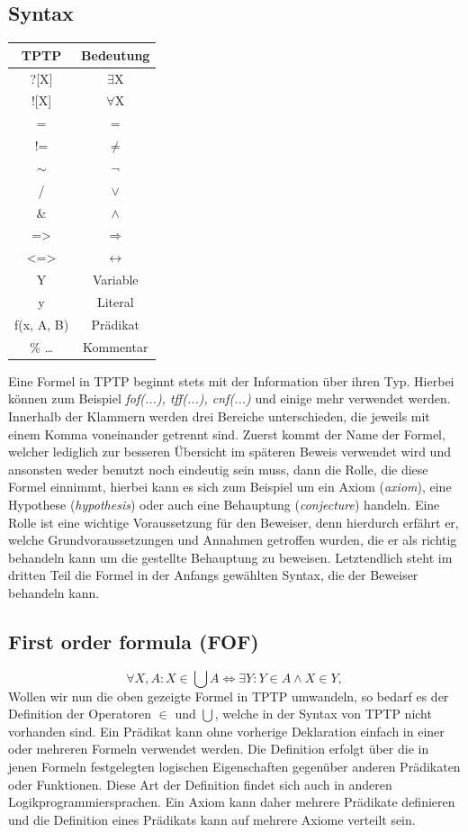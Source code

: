 \documentclass{article}
\begin{document}
\subsection{Syntax}
\label{subsec:syntax}
\begin{table}
\begin{tabular}{|c|c|}
	\hline TPTP & Bedeutung \\ 
	\hline ?[X] & $\exists$X \\
	\hline ![X] & $\forall$X \\
	\hline = & = \\
	\hline != & $\neq$ \\
	\hline $\sim$ & $\lnot$ \\
	\hline / & $\lor$ \\
	\hline \& & $\land$ \\
	\hline => & $\Rightarrow$ \\
	\hline <=> & $\leftrightarrow$ \\
	\hline Y & Variable \\
	\hline y & Literal \\
	\hline f(x, A, B) & Prädikat \\
	\hline \% \dots & Kommentar \\
	\hline
\end{tabular} 
\end{table}
Eine Formel in TPTP beginnt stets mit der Information über ihren Typ. Hierbei können zum Beispiel \textit{fof(...), tff(...), cnf(...)} und einige mehr verwendet werden.
Innerhalb der Klammern werden drei Bereiche unterschieden, die jeweils mit einem Komma voneinander getrennt sind. 
Zuerst kommt der Name der Formel, welcher lediglich zur besseren Übersicht im späteren Beweis verwendet wird und ansonsten weder benutzt noch eindeutig sein muss,
dann die Rolle, die diese Formel einnimmt, hierbei kann es sich zum Beispiel um ein Axiom (\textit{axiom}), eine Hypothese (\textit{hypothesis}) oder auch eine Behauptung (\textit{conjecture}) handeln.
Eine Rolle ist eine wichtige Voraussetzung für den Beweiser, denn hierdurch erfährt er, welche Grundvoraussetzungen und Annahmen getroffen wurden, die er als richtig behandeln kann um die gestellte Behauptung zu beweisen.
Letztendlich steht im dritten Teil die Formel in der Anfangs gewählten Syntax, die der Beweiser behandeln kann.
\subsection{First order formula (FOF)}
\label{subsec:tptpfof}
\[\forall X,A : X \in \bigcup A \Leftrightarrow \exists Y : Y \in A \land X \in Y,\]
Wollen wir nun die oben gezeigte Formel in TPTP umwandeln,
so bedarf es der Definition der Operatoren $\in$ und $\bigcup$, welche in der Syntax von TPTP 
nicht vorhanden sind.
Ein Prädikat kann ohne vorherige Deklaration einfach in einer oder mehreren Formeln 
verwendet werden. 
Die Definition erfolgt über die in jenen Formeln festgelegten logischen Eigenschaften gegenüber 
anderen Prädikaten oder Funktionen. Diese Art der Definition findet sich auch in anderen
Logikprogrammiersprachen.
Ein Axiom kann daher mehrere Prädikate definieren und die Definition eines Prädikats kann 
auf mehrere Axiome verteilt sein.
\end{document}
